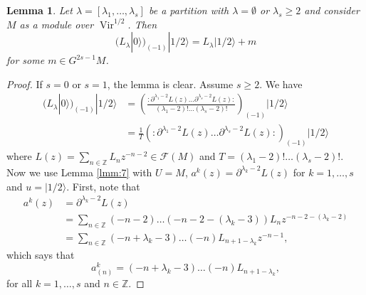 \documentclass[12pt,a4paper]{article}
\newtheorem{lemma}{Lemma}
\DeclareMathOperator{\Vir}{Vir}
\newcommand{\vac}{|0\rangle}
\newcommand{\vachalf}{|1/2\rangle}
\begin{document}
\begin{lemma}
  \label{lmm:8}
  Let $\lambda=[\lambda_1,\dots, \lambda_s]$ be a partition with $\lambda=\emptyset$ or $\lambda_s\ge 2$ and consider $M$ as a module over $\Vir^{1/2}$.
  Then
  \begin{equation*}
    (L_\lambda\vac)_{(-1)}\vachalf=L_\lambda\vachalf+m
  \end{equation*}
  for some $m\in G^{2s-1}M$.
\end{lemma}
\begin{proof}
  If $s=0$ or $s=1$, the lemma is clear.
  Assume $s\ge 2$.
  We have
  \begin{align*}
    (L_\lambda\vac)_{(-1)}\vachalf&=\left( \frac{:\partial^{\lambda_1-2}L(z)\dots\partial^{\lambda_s-2}L(z):}{(\lambda_1-2)!\dots(\lambda_s-2)!} \right)_{(-1)}\vachalf \\
    &=\frac{1}{T}(:\partial^{\lambda_1-2}L(z)\dots\partial^{\lambda_s-2}L(z):)_{(-1)}\vachalf
  \end{align*}
  where $L(z)=\sum_{n\in \mathbb{Z}}L_nz^{-n-2}\in \mathcal{F}(M)$ and $T=(\lambda_1-2)!\dots(\lambda_s-2)!$.
  Now we use Lemma \ref{lmm:7} with $U=M$, $a^k(z)=\partial^{\lambda_k-2}L(z)$ for $k=1,\dots,s$ and $u=\vachalf$.
  First, note that
  \begin{align*}
    a^k(z)&=\partial^{\lambda_k-2}L(z) \\
    &=\sum_{n\in \mathbb{Z}}(-n-2)\dots(-n-2-(\lambda_k-3))L_nz^{-n-2-(\lambda_k-2)} \\
    &=\sum_{n\in \mathbb{Z}}(-n+\lambda_k-3)\dots(-n)L_{n+1-\lambda_k}z^{-n-1},
  \end{align*}
  which says that
  \begin{equation*}
    a^k_{(n)}=(-n+\lambda_k-3)\dots(-n)L_{n+1-\lambda_k},
  \end{equation*}
  for all $k=1,\dots, s$ and $n\in \mathbb{Z}$.


\end{proof}
\end{document}
